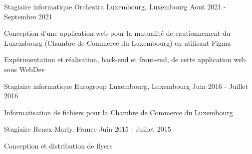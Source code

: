
\begin{cventries}
  \cventry
    {Stagiaire informatique} %
    {Orchestra} %
    {Luxembourg, Luxembourg} %
    {Aout 2021 - Septembre 2021} %
    {
      \begin{cvitems} %
        \item {Conception d'une application web pour la mutualité de cautionnement du Luxembourg (Chambre de Commerce du Luxembourg) en utilisant Figma}
        \item {Expérimentation et réalisation, back-end et front-end, de cette application web sous WebDev}
      \end{cvitems}
    }

  \cventry
    {Stagiaire informatique} %
    {Eurogroup} %
    {Luxembourg, Luxembourg} %
    {Juin 2016 - Juillet 2016} %
    {
      \begin{cvitems} %
        \item {Informatisation de fichiers pour la Chambre de Commerce du Luxembourg}
      \end{cvitems}
    }

  \cventry
    {Stagiaire} %
    {Renex} %
    {Marly, France} %
    {Juin 2015 - Juillet 2015} %
    {
      \begin{cvitems} %
        \item {Conception et distribution de flyers}
      \end{cvitems}
    }

\end{cventries}
